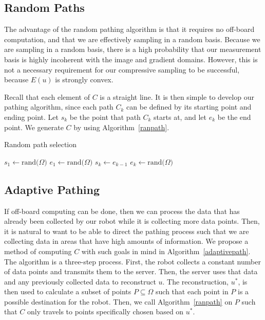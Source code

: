 \documentclass[english]{article}\usepackage[]{graphicx}\usepackage[]{color}
\begin{document}
\subsection{Random Paths}

The advantage of the random pathing algorithm is that it requires no off-board computation, and that we are effectively sampling in a 
random basis. Because we are sampling in a random basis, there is a high probability that our measurement basis is highly incoherent 
with the image and gradient domains. However, this is not a necessary requirement for our compressive sampling to be successful, 
because $E(u)$ is strongly convex.

Recall that each element of $C$ is a straight line. It is then simple to develop our pathing algorithm, since each path $C_k$ can be 
defined by its starting point and ending point. Let $s_k$ be the point that path $C_k$ starts at, and let $e_k$ be the end point. We generate $C$ by using Algorithm~\ref{ranpath}.

\begin{algorithm}[H]
\caption{Random path selection}\label{ranpath}
\begin{algorithmic}[1]
\State $s_1\gets \text{rand(}\Omega)$
\State $e_1\gets \text{rand(}\Omega)$
\State $s_k\gets e_{k-1}$
\State $e_k\gets \text{rand(}\Omega)$
\EndFor
\EndProcedure
\end{algorithmic}
\end{algorithm}

\subsection{Adaptive Pathing}

If off-board computing can be done, then we can process the data that has already been collected by our robot while it is collecting 
more data points. Then, it is natural to want to be able to direct the pathing process such that we are collecting data in areas that 
have high amounts of information. We propose a method of computing $C$ with such goals in mind in Algorithm~\ref{adaptivepath}. The 
algorithm is a three-step process. First, the robot collects a constant number of data points and transmits them to the server. Then, 
the server uses that data and any previously collected data to reconstruct $u$. The reconstruction, $u^*$, is then used to calculate 
a subset of points $P\subseteq\Omega$ such that each point in $P$ is a possible destination for the robot. Then, we call Algorithm~\ref{ranpath} on $P$ such that $C$ only travels to points specifically chosen based on $u^*$.
\end{document}
